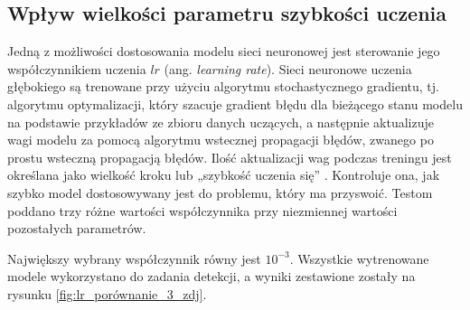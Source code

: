 \subsection{Wpływ wielkości parametru szybkości uczenia}
\hspace{0.5cm}
Jedną z możliwości dostosowania modelu sieci neuronowej jest sterowanie jego współczynnikiem uczenia $lr$ (ang. \emph{learning rate}). Sieci neuronowe uczenia głębokiego są trenowane przy użyciu algorytmu stochastycznego gradientu, tj. algorytmu optymalizacji, który szacuje gradient błędu dla bieżącego stanu modelu na podstawie przykładów ze zbioru danych uczących, a następnie aktualizuje wagi modelu za pomocą algorytmu wstecznej propagacji błędów, zwanego po prostu wsteczną propagacją błędów. Ilość aktualizacji wag podczas treningu jest określana jako wielkość kroku lub „szybkość uczenia się” \cite{lr}. Kontroluje ona, jak szybko model dostosowywany jest do problemu, który ma przyswoić. Testom poddano trzy różne wartości współczynnika przy niezmiennej wartości pozostałych parametrów.

\hspace{0.5cm}
Największy wybrany współczynnik równy jest $10^{-3}$. Wszystkie wytrenowane modele wykorzystano do zadania detekcji, a wyniki zestawione zostały na rysunku \ref{fig:lr_porównanie_3_zdj}. 

